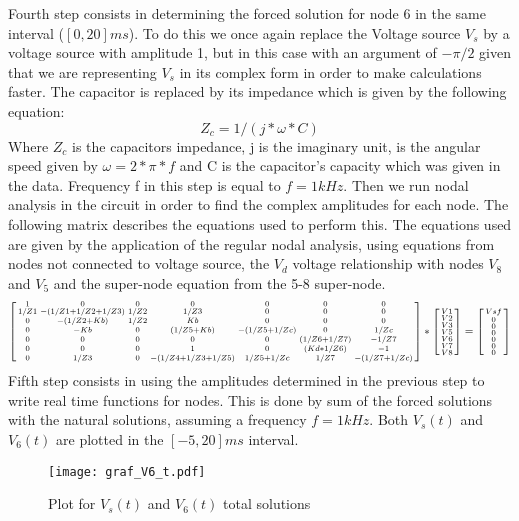 Fourth step consists in determining the forced solution for node 6 in the same interval ($[0, 20]ms$). To do this we once again replace the Voltage source $V_s$ by a voltage source with amplitude 1, but in this case with an argument of $-\pi/2$ given that we are representing $V_s$ in its complex form in order to make calculations faster. The capacitor is replaced by its impedance which is given by the following equation:
\begin{equation}
Z_c=1/(j*\omega*C)
\end{equation}
Where $Z_c$ is the capacitors impedance, j is the imaginary unit, \omega is the angular speed given by $\omega=2*\pi*f$ and C is the capacitor's capacity which was given in the data. Frequency f in this step is equal to $f=1kHz$.
Then we run nodal analysis in the circuit in order to find the complex amplitudes for each node. The following matrix describes the equations used to perform this. The equations used are given by the application of the regular nodal analysis, using equations from nodes not connected to voltage source, the $V_d$ voltage relationship with nodes $V_8$ and $V_5$ and the super-node equation from the 5-8 super-node.
\begin{equation}
\begin{bsmallmatrix}
1 & 0 & 0 & 0 & 0 & 0 & 0\\
1/Z1 & -(1/Z1 + 1/Z2 + 1/Z3) & 1/Z2 & 1/Z3 & 0 & 0 & 0\\
0 & -(1/Z2 + Kb) & 1/Z2 & Kb & 0 & 0 & 0\\
0 & -Kb & 0 & (1/Z5 + Kb) & -(1/Z5+1/Zc) & 0 & 1/Zc\\
0 & 0 & 0 & 0 & 0 & (1/Z6 + 1/Z7) & -1/Z7\\
0 & 0 & 0 & 1 & 0 & (Kd * 1/Z6) & -1\\
0 & 1/Z3 & 0 & -(1/Z4 + 1/Z3 + 1/Z5) & 1/Z5+1/Zc & 1/Z7 & -(1/Z7+1/Zc)\\
\end{bsmallmatrix}
*
\begin{bsmallmatrix}
V1\\V2\\V3\\V5\\V6\\V7\\V8
\end{bsmallmatrix}
=
\begin{bsmallmatrix}
Vsf\\0\\0\\0\\0\\0\\0
\end{bsmallmatrix}
\end{equation}
Fifth step consists in using the amplitudes determined in the previous step to write real time functions for nodes. This is done by sum of the forced solutions with the natural solutions, assuming a frequency $f=1kHz$. Both $V_s(t)$ and $V_6(t)$ are plotted in the $[-5, 20]ms$ interval.
\begin{figure}[h] \centering
\texttt{[image: graf\_V6\_t.pdf]}
\caption{Plot for $V_s(t)$ and $V_6(t)$ total solutions}
\end{figure}

